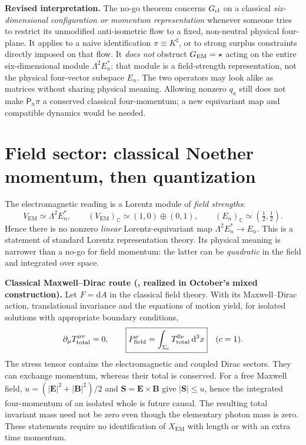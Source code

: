 \documentclass[10.5pt,a4paper]{article}
\newcommand{\dd}{\mathrm d}
\newcommand{\pr}{\mathsf P}
\newcommand{\Xem}{X_{\mathrm{EM}}}
\newcommand{\st}[1]{\textcolor{muted}{\small\sffamily [#1]}}
\begin{document}
\textbf{Revised interpretation.} The no-go theorem concerns $G_{\rm cl}$ on a classical \emph{six-dimensional configuration or momentum representation} whenever someone tries to restrict its unmodified anti-isometric flow to a fixed, non-neutral physical four-plane. It applies to a naive identification $\pi\equiv K^\sharp$, or to strong surplus constraints directly imposed on that flow. It \emph{does not} obstruct $G_{\rm EM}=\star$ acting on the entire six-dimensional module $\Lambda^2E_n^*$: that module is a field-strength representation, not the physical four-vector subspace $E_n$. The two operators may look alike as matrices without sharing physical meaning. Allowing nonzero $q_a$ still does not make $\pr_n\pi$ a conserved classical four-momentum; a new equivariant map and compatible dynamics would be needed.

\section{Field sector: classical Noether momentum, then quantization}
The electromagnetic reading is a Lorentz module of \emph{field strengths}:
\begin{equation}
  V_{\mathrm{EM}}\simeq\Lambda^2E_n^*,\qquad
  (V_{\mathrm{EM}})_\mathbb C\simeq(1,0)\oplus(0,1),\qquad
  (E_n)_\mathbb C\simeq(\tfrac12,\tfrac12).
\end{equation}
Hence there is no nonzero \emph{linear} Lorentz-equivariant map $\Lambda^2E_n^*\to E_n$. This is a statement of standard Lorentz representation theory. Its physical meaning is narrower than a no-go for field momentum: the latter can be \emph{quadratic} in the field and integrated over space.

\textbf{Classical Maxwell--Dirac route (\st{Standard}, realized in October's mixed construction).} Let $F=\dd A$ in the classical field theory. With its Maxwell--Dirac action, translational invariance and the equations of motion yield, for isolated solutions with appropriate boundary conditions,
\begin{equation}\label{eq:Tmunu}
 \partial_\mu T^{\mu\nu}_{\rm total}=0,\qquad
 \boxed{P^\nu_{\rm field}=\int_{\Sigma_t}T^{0\nu}_{\rm total}\,\dd^3x}
 \quad (c=1).
\end{equation}
The stress tensor contains the electromagnetic and coupled Dirac sectors. They can exchange momentum, whereas their total is conserved. For a free Maxwell field, $u=(|\mathbf E|^2+|\mathbf B|^2)/2$ and $\mathbf S=\mathbf E\times\mathbf B$ give $|\mathbf S|\le u$, hence the integrated four-momentum of an isolated whole is future causal. The resulting total invariant mass need not be zero even though the elementary photon mass is zero. These statements require no identification of $\Xem$ with length or with an extra time momentum.
\end{document}
